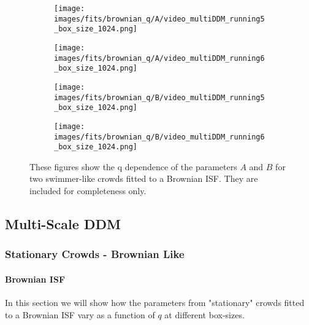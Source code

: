 \documentclass[10pt]{article}
\begin{document}
\begin{figure}[H]
\begin{subfigure}[t]{.5\textwidth}
  \centering
  \texttt{[image: images/fits/brownian\_q/A/video\_multiDDM\_running5\_box\_size\_1024.png]}
  \caption{}
\end{subfigure}%
\hfill
\begin{subfigure}[t]{.5\textwidth}
  \centering
  \texttt{[image: images/fits/brownian\_q/A/video\_multiDDM\_running6\_box\_size\_1024.png]}
  \caption{}
\end{subfigure}
\label{fig:running_brownian_fits_A}
\par\bigskip
\begin{subfigure}[t]{.5\textwidth}
  \centering
  \texttt{[image: images/fits/brownian\_q/B/video\_multiDDM\_running5\_box\_size\_1024.png]}
  \caption{}
\end{subfigure}%
\hfill
\begin{subfigure}[t]{.5\textwidth}
  \centering
  \texttt{[image: images/fits/brownian\_q/B/video\_multiDDM\_running6\_box\_size\_1024.png]}
  \caption{}
\end{subfigure}
\caption{These figures show the q dependence of the parameters $A$ and $B$ for two swimmer-like crowds fitted to a Brownian ISF. They are included for completeness only.}
\label{fig:running_brownian_fits_B}
\end{figure}

\clearpage
\subsection{Multi-Scale DDM}

\subsubsection{Stationary Crowds - Brownian Like}
\paragraph{Brownian ISF} In this section we will show how the parameters from "stationary" crowds fitted to a Brownian ISF vary as a function of $q$ at different box-sizes. 
\end{document}
